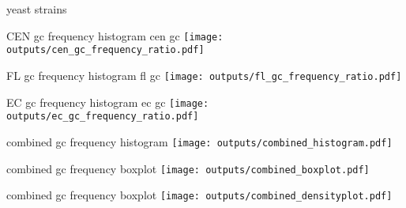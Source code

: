 \documentclass{beamer}
\begin{document}
\nocite{*}

\begin{frame} {yeast strains}
    
\end{frame}

\begin{frame} {CEN gc frequency histogram}
    cen gc
    \texttt{[image: outputs/cen\_gc\_frequency\_ratio.pdf]}
\end{frame}

\begin{frame} {FL gc frequency histogram}
    fl gc
    \texttt{[image: outputs/fl\_gc\_frequency\_ratio.pdf]}
\end{frame}

\begin{frame} {EC gc frequency histogram}
    ec gc
    \texttt{[image: outputs/ec\_gc\_frequency\_ratio.pdf]}
\end{frame}

\begin{frame} {combined gc frequency histogram}
    \texttt{[image: outputs/combined\_histogram.pdf]}
\end{frame}

\begin{frame} {combined gc frequency boxplot}
    \texttt{[image: outputs/combined\_boxplot.pdf]}
\end{frame}

\begin{frame} {combined gc frequency boxplot}
    \texttt{[image: outputs/combined\_densityplot.pdf]}
\end{frame}



\end{document}
